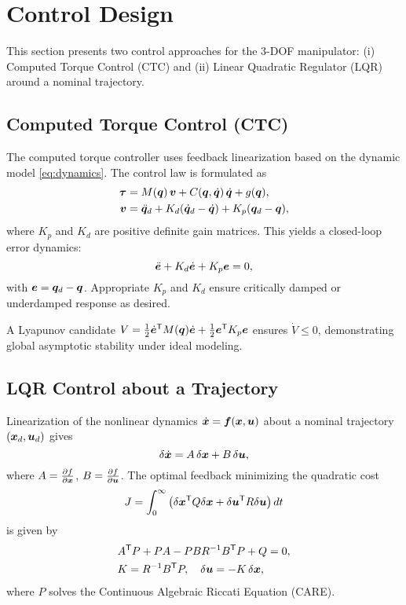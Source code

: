 ﻿%
\section{Control Design}\label{sec:control}

This section presents two control approaches for the 3-DOF manipulator:
(i) Computed Torque Control (CTC) and (ii) Linear Quadratic Regulator (LQR) around a nominal trajectory.

\subsection{Computed Torque Control (CTC)}
The computed torque controller uses feedback linearization based on the dynamic model
\eqref{eq:dynamics}. The control law is formulated as
\begin{align}
  \bm{\tau} &= M(\bm{q})\,\bm{v} + C(\bm{q},\dot{\bm{q}})\,\dot{\bm{q}} + g(\bm{q}), \\
  \bm{v} &= \ddot{\bm{q}}_d 
            + K_d(\dot{\bm{q}}_d - \dot{\bm{q}}) 
            + K_p(\bm{q}_d - \bm{q}),
\end{align}
where $K_p$ and $K_d$ are positive definite gain matrices.
This yields a closed-loop error dynamics:
\begin{equation}
  \ddot{\bm{e}} + K_d\dot{\bm{e}} + K_p\bm{e} = 0,
\end{equation}
with $\bm{e} = \bm{q}_d - \bm{q}$. 
Appropriate $K_p$ and $K_d$ ensure critically damped or underdamped response as desired.

\begin{tcolorbox}[title=Stability Remark, colback=white!98!gray]
A Lyapunov candidate $V = \tfrac{1}{2}\dot{\bm{e}}^{\mathsf{T}} M(\bm{q})\dot{\bm{e}} 
+ \tfrac{1}{2}\bm{e}^{\mathsf{T}} K_p\bm{e}$ ensures $\dot{V} \le 0$, 
demonstrating global asymptotic stability under ideal modeling.
\end{tcolorbox}

\subsection{LQR Control about a Trajectory}
Linearization of the nonlinear dynamics $\dot{\bm{x}} = \bm{f}(\bm{x}, \bm{u})$
about a nominal trajectory $(\bm{x}_d, \bm{u}_d)$ gives
\begin{equation}
  \delta\dot{\bm{x}} = A\,\delta\bm{x} + B\,\delta\bm{u},
\end{equation}
where $A = \tfrac{\partial f}{\partial \bm{x}}$, $B = \tfrac{\partial f}{\partial \bm{u}}$.
The optimal feedback minimizing the quadratic cost
\[
  J = \int_0^\infty \left(\delta\bm{x}^{\mathsf{T}} Q \delta\bm{x} 
  + \delta\bm{u}^{\mathsf{T}} R \delta\bm{u}\right) dt
\]
is given by
\begin{align}
  &A^{\mathsf{T}} P + P A - P B R^{-1} B^{\mathsf{T}} P + Q = 0, \\
  &K = R^{-1} B^{\mathsf{T}} P, \quad 
  \delta\bm{u} = -K\,\delta\bm{x},
\end{align}
where $P$ solves the Continuous Algebraic Riccati Equation (CARE).

